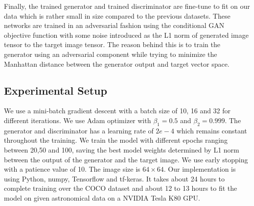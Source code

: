 \documentclass[conference]{IEEEtran}
\begin{document}
\hspace*{0.25 in}Finally, the trained generator and trained discriminator are fine-tune to fit on our data which is rather small in size compared to the previous datasets. These networks are trained in an adversarial fashion using the conditional GAN objective function \citep{isola2018imagetoimage} with some noise introduced as the L1 norm of generated image tensor to the target image tensor. The reason behind this is to train the generator using an adversarial component while trying to minimize the Manhattan distance between the generator output and target vector space.
\subsection{Experimental Setup}
\hspace*{0.25 in}We use a mini-batch gradient descent with a batch size of 10, 16 and 32 for different iterations. We use Adam optimizer with $\beta_1 = 0.5$ and $\beta_2 = 0.999$. The generator and discriminator has a learning rate of $2e-4$ which remains constant throughout the training. We train the model with different epochs ranging between 20,50 and 100, saving the best model weights determined by L1 norm between the output of the generator and the target image. We use early stopping with a patience value of 10. The image size is $64\times64$. Our implementation is using Python, numpy, Tensorflow and tf-keras. It takes about 24 hours to complete training over the COCO dataset and about 12 to 13 hours to fit the model on given astronomical data on a NVIDIA Tesla K80 GPU.
\end{document}
